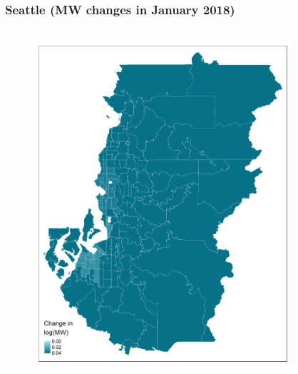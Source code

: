 \documentclass[aspectratio=169, t]{beamer}
\begin{document}
\begin{frame}[label = seattle_example]
\frametitle{Seattle (MW changes in January 2018)}
    \begin{columns}
        \begin{column}{0.50\textwidth}
            \vspace{-4mm}
            \begin{figure}
                \centering
                \includegraphics[scale = 0.36]{maps_events/output/seattle_2018-12_actual_mw.png}
            \end{figure}   
        \end{column}
        \begin{column}{0.50\textwidth}
            \vspace{-4mm}
            \begin{figure}
                \centering

\end{figure}
\end{column}
\end{columns}
\end{frame}
\end{document}
